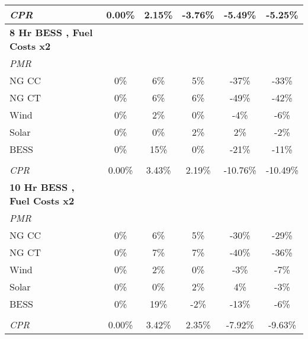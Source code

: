 \begin{table}[]
\begin{tabular}{lccccc}
\quad \textit{CPR} & 0.00\% & 2.15\% & -3.76\% & -5.49\% & -5.25\% \\\hline
\textbf{8 Hr BESS , Fuel Costs x2} &  &  &  &  & \\
 \quad \textit{PMR}  &  &  &  &  & \\
\qquad NG CC & 0\% & 6\% & 5\% & -37\% & -33\% \\
\qquad NG CT & 0\% & 6\% & 6\% & -49\% & -42\% \\
\qquad Wind & 0\% & 2\% & 0\% & -4\% & -6\% \\
\qquad Solar & 0\% & 0\% & 2\% & 2\% & -2\% \\
\qquad BESS & 0\% & 15\% & 0\% & -21\% & -11\% \\
&  &  &  &  & \\
\quad \textit{CPR} & 0.00\% & 3.43\% & 2.19\% & -10.76\% & -10.49\% \\\hline
\textbf{10 Hr BESS , Fuel Costs x2} &  &  &  &  & \\
 \quad \textit{PMR}  &  &  &  &  & \\
\qquad NG CC & 0\% & 6\% & 5\% & -30\% & -29\% \\
\qquad NG CT & 0\% & 7\% & 7\% & -40\% & -36\% \\
\qquad Wind & 0\% & 2\% & 0\% & -3\% & -7\% \\
\qquad Solar & 0\% & 0\% & 2\% & 4\% & -3\% \\
\qquad BESS & 0\% & 19\% & -2\% & -13\% & -6\% \\
&  &  &  &  & \\
\quad \textit{CPR} & 0.00\% & 3.42\% & 2.35\% & -7.92\% & -9.63\% \\\hline
\end{tabular}
\end{table}
